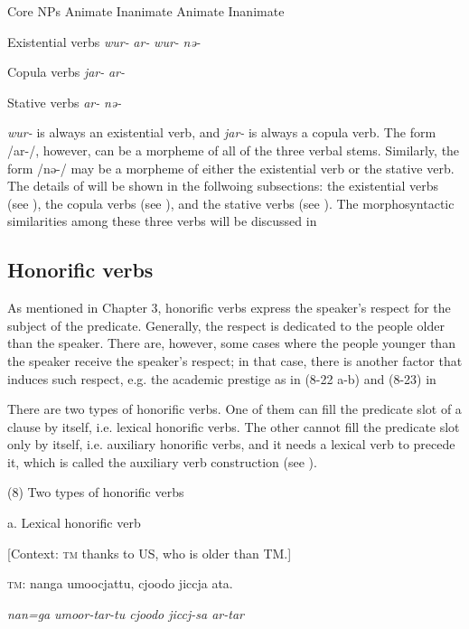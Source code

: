 Core NPs  Animate  Inanimate  Animate  Inanimate

Existential verbs  \textit{wur-}  \textit{ar-}  \textit{wur-}  \textit{nə-}

Copula verbs  \textit{jar-}  \textit{ar-}

Stative verbs  \textit{ar-}  \textit{nə-}

\textit{wur-} is always an existential verb, and \textit{jar-} is always a copula verb. The form /ar-/, however, can be a morpheme of all of the three verbal stems. Similarly, the form /nə-/ may be a morpheme of either the existential verb or the stative verb. The details of  will be shown in the follwoing subsections: the existential verbs (see ), the copula verbs (see ), and the stative verbs (see ). The morphosyntactic similarities among these three verbs will be discussed in 

\subsection{Honorific verbs}

As mentioned in Chapter 3, honorific verbs express the speaker’s respect for the subject of the predicate. Generally, the respect is dedicated to the people older than the speaker. There are, however, some cases where the people younger than the speaker receive the speaker’s respect; in that case, there is another factor that induces such respect, e.g. the academic prestige as in (8-22 a-b) and (8-23) in 

There are two types of honorific verbs. One of them can fill the predicate slot of a clause by itself, i.e. lexical honorific verbs. The other cannot fill the predicate slot only by itself, i.e. auxiliary honorific verbs, and it needs a lexical verb to precede it, which is called the auxiliary verb construction (see ).

(8)  Two types of honorific verbs

  a.  Lexical honorific verb

    [Context: \textsc{tm} thanks to US, who is older than TM.]

    \textsc{tm}:  nanga  umoocjattu,  {\textbar}cjoodo{\textbar}  jiccja  ata.

      \textit{nan=ga}  \textit{umoor{}-tar-tu  cjoodo  jiccj-sa  ar-tar}

